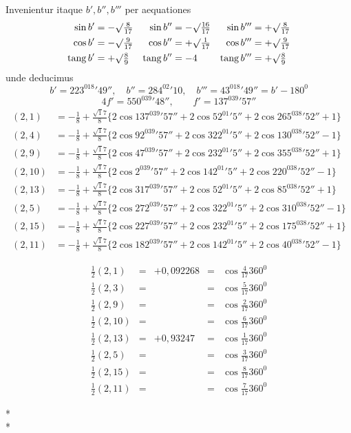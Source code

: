 Invenientur itaque $b',b'',b'''$ per aequationes
\[
\begin{aligned}
\sin b'&=-\surd\tfrac8{17}&\sin b''&=-\surd\tfrac{16}{17}&\sin b'''&=+\surd\tfrac8{17}\\
\cos b'&=-\surd\tfrac9{17}&\cos b''&=+\surd\tfrac1{17}&\cos b'''&=+\surd\tfrac9{17}\\
\operatorname{tang}b'&=+\surd\tfrac89&\operatorname{tang}b''&=-4&\operatorname{tang}b'''&=+\surd\tfrac89
\end{aligned}
\]
unde deducimus
\[
b'=223^018'49'',\quad b''=284^02'10,\quad b'''=43^018'49''=b'-180^0
\]
\[
4f'=550^039'48'',\qquad f'=137^039'57''
\]
\[
\begin{aligned}
(2,1)&=-\frac18+\frac{\surd17}8\{2\cos137^039'57''+2\cos52^01'5''+2\cos265^038'52''+1\}\\
(2,4)&=-\frac18+\frac{\surd17}8\{2\cos92^039'57''+2\cos322^01'5''+2\cos130^038'52''-1\}\\
(2,9)&=-\frac18+\frac{\surd17}8\{2\cos47^039'57''+2\cos232^01'5''+2\cos355^038'52''+1\}\\
(2,10)&=-\frac18+\frac{\surd17}8\{2\cos2^039'57''+2\cos142^01'5''+2\cos220^038'52''-1\}\\
(2,13)&=-\frac18+\frac{\surd17}8\{2\cos317^039'57''+2\cos52^01'5''+2\cos85^038'52''+1\}\\
(2,5)&=-\frac18+\frac{\surd17}8\{2\cos272^039'57''+2\cos322^01'5''+2\cos310^038'52''-1\}\\
(2,15)&=-\frac18+\frac{\surd17}8\{2\cos227^039'57''+2\cos232^01'5''+2\cos175^038'52''+1\}\\
(2,11)&=-\frac18+\frac{\surd17}8\{2\cos182^039'57''+2\cos142^01'5''+2\cos40^038'52''-1\}
\end{aligned}
\]

%
\[
\begin{array}{rclcl}
\frac12(2,1)&=&+0{,}092268&=&\cos\frac4{17}360^0\\[3pt]
\frac12(2,3)&=&&=&\cos\frac5{17}360^0\\[3pt]
\frac12(2,9)&=&&=&\cos\frac2{17}360^0\\[3pt]
\frac12(2,10)&=&&=&\cos\frac6{17}360^0\\[3pt]
\frac12(2,13)&=&+0{,}93247&=&\cos\frac1{17}360^0\\[3pt]
\frac12(2,5)&=&&=&\cos\frac3{17}360^0\\[3pt]
\frac12(2,15)&=&&=&\cos\frac8{17}360^0\\[3pt]
\frac12(2,11)&=&&=&\cos\frac7{17}360^0
\end{array}
\]
\begin{center}*\qquad\qquad*\\*\end{center}

